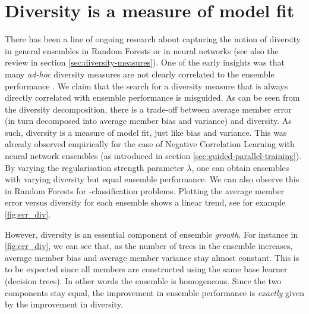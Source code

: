 \documentclass[
	twoside=false, %
]{kaobook}
\begin{document}
\section{Diversity is a measure of model fit}

There has been a line of ongoing research about capturing the notion of diversity in general ensembles
\cite{kuncheva_MeasuresDiversityClassifier_2003,zhang_EnsembleMachineLearning_2012,melville_CreatingDiversityEnsembles_2005}
in Random Forests 
\cite{panhalkar_NovelApproachBuild_2022,zouggar_SimplifyingRandomForests_2019,adnan_ComplementRandomForest_2015}
or in neural networks
\cite{liu_EnsembleLearningNegative_1999,li_NeuralNetworkEnsembles_2021,abe_PathologiesPredictiveDiversity_2023,abe_BestDeepEnsembles_2022}
(see also the review in section \ref{sec:diversity-measures}). One of the early insights was that many \textit{ad-hoc} diversity measures are not clearly correlated to the ensemble performance
\cite{kuncheva_MeasuresDiversityClassifier_2003}. We claim that the search for a diversity measure that is always directly correlated with ensemble performance is misguided. As can be seen from the diversity decomposition, there is a trade-off between average member error (in turn decomposed into average member bias and variance) and diversity. As such, diversity is a measure of model fit, just like bias and variance.
This was already observed empirically  for the case of Negative Correlation Learning with neural network ensembles \cite{buschjager_ThereNoDoubleDescent_2021} (as introduced in section \ref{sec:guided-parallel-training}). By varying the regularisation strength parameter $\lambda$, one can obtain ensembles with varying diversity but equal ensemble performance.
We can also observe this in Random Forests for \zeroone-classification problems. Plotting the average member error versus diversity for each ensemble shows a linear trend, see for example \cref{fig:err_div}. 

However, diversity is an essential component of ensemble \textit{growth}. For instance in \cref{fig:err_div}, we can see that, as the number of trees in the ensemble increases, average member bias and average member variance stay almost constant. This is to be expected since all members are constructed using the same base learner (decision trees). In other words the ensemble is homogeneous. Since the two components stay equal, the improvement in ensemble performance is \textit{exactly} given by the improvement in diversity.
\end{document}
